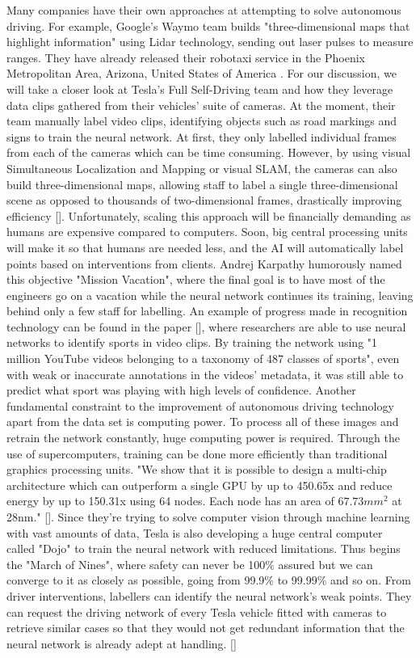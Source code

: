 \documentclass{article}
\begin{document}
Many companies have their own approaches at attempting to solve autonomous driving. For example, Google's Waymo team builds "three-dimensional maps that highlight information" using Lidar technology, sending out laser pulses to measure ranges. They have already released their robotaxi service in the Phoenix Metropolitan Area, Arizona, United States of America \textcite{waymo}. For our discussion, we will take a closer look at Tesla's Full Self-Driving team and how they leverage data clips gathered from their vehicles' suite of cameras. At the moment, their team manually label video clips, identifying objects such as road markings and signs to train the neural network. At first, they only labelled individual frames from each of the cameras which can be time consuming. However, by using visual Simultaneous Localization and Mapping or visual SLAM, the cameras can also build three-dimensional maps, allowing staff to label a single three-dimensional scene as opposed to thousands of two-dimensional frames, drastically improving efficiency [\textcite{durrant2006simultaneous}].
\bigbreak
Unfortunately, scaling this approach will be financially demanding as humans are expensive compared to computers. Soon, big central processing units will make it so that humans are needed less, and the AI will automatically label points based on interventions from clients. Andrej Karpathy humorously named this objective "Mission Vacation", where the final goal is to have most of the engineers go on a vacation while the neural network continues its training, leaving behind only a few staff for labelling. An example of progress made in recognition technology can be found in the paper [\textcite{karpathy2014large}], where researchers are able to use neural networks to identify sports in video clips. By training the network using "1 million YouTube videos belonging to a taxonomy of 487 classes of sports", even with weak or inaccurate annotations in the videos' metadata, it was still able to predict what sport was playing with high levels of confidence.
\bigbreak
Another fundamental constraint to the improvement of autonomous driving technology apart from the data set is computing power. To process all of these images and retrain the network constantly, huge computing power is required. Through the use of supercomputers, training can be done more efficiently than traditional graphics processing units. "We show that it is possible to design a multi-chip architecture which can outperform a single GPU by up to 450.65x and reduce energy by up to 150.31x using 64 nodes. Each node has an area of $67.73mm^2$ at 28nm." [\textcite{chen2014dadiannao}]. Since they're trying to solve computer vision through machine learning with vast amounts of data, Tesla is also developing a huge central computer called "Dojo" to train the neural network with reduced limitations. Thus begins the "March of Nines", where safety can never be 100\% assured but we can converge to it as closely as possible, going from 99.9\% to 99.99\% and so on. From driver interventions, labellers can identify the neural network's weak points. They can request the driving network of every Tesla vehicle fitted with cameras to retrieve similar cases so that they would not get redundant information that the neural network is already adept at handling. [\textcite{autonomyday}]
\end{document}
